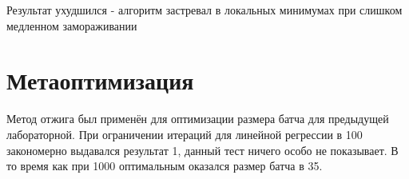 \documentclass{article}
\begin{document}
Результат ухудшился - алгоритм застревал в локальных минимумах при слишком медленном замораживании



\section{Метаоптимизация}
Метод отжига был применён для оптимизации размера батча для предыдущей лабораторной. При ограничении итераций для линейной регрессии в 100 закономерно выдавался результат 1, данный тест ничего особо не показывает. В то время как при 1000 оптимальным оказался размер батча в 35.
\end{document}
